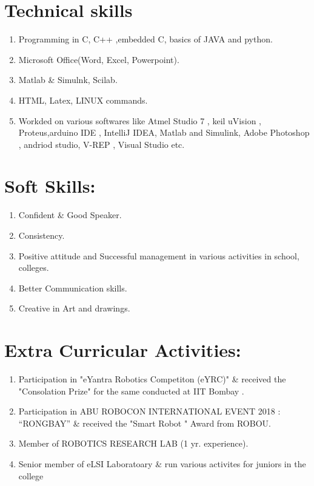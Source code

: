 \documentclass[margin,line]{res}
\begin{document}
\begin{resume}
{\section{\Large\bf{Technical skills}}}
\begin{enumerate}
	\item{Programming in C, C++ ,embedded C, basics of JAVA and python.}
	\item{Microsoft Office(Word, Excel, Powerpoint).}
	\item{Matlab \& Simulnk, Scilab.}
	\item{HTML, Latex, LINUX commands.}
	\item{Workded on various softwares like Atmel Studio 7 , keil uVision , Proteus,arduino IDE , IntelliJ IDEA, Matlab and Simulink, Adobe Photoshop , andriod studio, V-REP , Visual Studio  etc.}
\end{enumerate}
\hfill






{\section{\Large\bf{Soft Skills:}}}
\begin{enumerate}
	\item{Confident \& Good Speaker.}
	\item{Consistency.}
	\item{Positive attitude and Successful management in various activities in school, colleges.}	
	\item{Better Communication skills.}
	\item{Creative in Art and drawings.}	
\end{enumerate}
\hfill





{\section{\Large\bf{Extra Curricular Activities:}}}
\begin{enumerate}
	\item{Participation in "eYantra Robotics Competiton (eYRC)" \& received the "Consolation Prize" for the same 			conducted at IIT Bombay .}
	\item{Participation in ABU ROBOCON INTERNATIONAL EVENT 2018 : “RONGBAY” \& received the "Smart 				Robot " Award from ROBOU.}
	\item{Member of ROBOTICS RESEARCH LAB (1 yr. experience).}
	\item{Senior member of eLSI Laboratoary \& run various activites for juniors in the college} 


\end{enumerate}
\end{resume}
\end{document}
